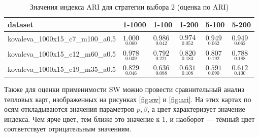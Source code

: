 \documentclass[12pt,twoside,a4paper,tikz,border=5]{refart}
\begin{document}
		\begin{table}[h!]
			\centering
			\caption{Значения индекса ARI для стратегии выбора 2 (оценка по ARI)} \label{tab:ari-strategy2-ari}
			\begin{tabularx}{\textwidth}{|L{0.4\textwidth}|C{0.09\textwidth}|C{0.09\textwidth}|C{0.09\textwidth}|C{0.09\textwidth}|Z|}
				\hline
				dataset                           & 1-1000                      & 1-100                       &  1-200                      & 5-100                       & 5-200 \\ \hline
				kovaleva\_1000x15\_c7\_m100\_a0.5 & $ \underset{0.000}{1.000} $ & $ \underset{0.042}{0.986} $ & $ \underset{0.052}{0.974} $ & $ \underset{0.062}{0.949} $ & $ \underset{0.062}{0.949} $ \\ \hline
				kovaleva\_1000x15\_c12\_m60\_a0.5 & $ \underset{0.039}{0.978} $ & $ \underset{0.221}{0.792} $ & $ \underset{0.183}{0.820} $ & $ \underset{0.192}{0.807} $ & $ \underset{0.188}{0.788} $ \\ \hline
				kovaleva\_1000x15\_c19\_m35\_a0.5 & $ \underset{0.046}{0.829} $ & $ \underset{0.088}{0.636} $ & $ \underset{0.108}{0.631} $ & $ \underset{0.090}{0.591} $ & $ \underset{0.100}{0.612} $ \\ \hline
			\end{tabularx}
		\end{table}

		Также для оценки применимости SW можно провести сравнительный анализ тепловых карт, изображенных на рисунках \ref{fig:sw} и \ref{fig:ari}. На этих картах по осям откладываются значения параметров $ p, \beta $, а цвет характеризует значение индекса. Чем ярче цвет, тем ближе это значение к 1, и наоборот --- тёмный цвет соответствует отрицательным значениям.
\end{document}

